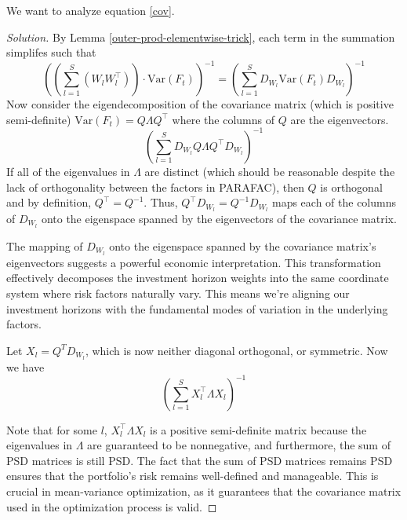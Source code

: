

\begin{note}
We want to analyze equation \ref{cov}.

\begin{proof}[Solution]
By Lemma \ref{outer-prod-elementwise-trick}, each term in the summation simplifes such that
\[\left( \left( \sum_{l=1}^S (W_l W_l^\top)\right) \cdot \text{Var}(F_t)\right)^{-1}  = \left( \sum_{l=1}^S D_{W_l} \text{Var}(F_t) D_{W_l}\right)^{-1}\]
Now consider the eigendecomposition of the covariance matrix (which is positive semi-definite) $\text{Var}(F_t) = Q\Lambda Q^\top$
where the columns of $Q$ are the eigenvectors. 
\[\left( \sum_{l=1}^S D_{W_l} Q \Lambda Q^\top D_{W_l}\right)^{-1}\]
If all of the eigenvalues in $\Lambda$ are distinct (which should be reasonable despite the 
lack of orthogonality between the factors in PARAFAC), then $Q$ is orthogonal and by definition, 
$Q^\top = Q^{-1}$. Thus, $Q^\top D_{W_l} = Q^{-1} D_{W_l}$ maps each of the columns of $D_{W_l}$
onto the eigenspace spanned by the eigenvectors of the covariance matrix. 

The mapping of $D_{W_l}$ onto the eigenspace spanned by the covariance matrix’s eigenvectors suggests a powerful economic interpretation. 
This transformation effectively decomposes the investment horizon weights into the same coordinate system where risk factors naturally vary. 
This means we’re aligning our investment horizons with the fundamental modes of variation in the underlying factors.

Let $X_l = Q^T D_{W_l}$, which is now neither diagonal orthogonal, or symmetric. Now we have 
\[\left( \sum_{l=1}^S X_l^\top \Lambda X_l \right)^{-1}\]

Note that for some $l$, $X_l^\top \Lambda X_l$ is a positive semi-definite matrix because the eigenvalues 
in $\Lambda$ are guaranteed to be nonnegative, and furthermore, the sum of PSD matrices is still PSD. The fact that the sum of PSD matrices remains PSD ensures that the portfolio's risk remains 
well-defined and manageable. This is crucial in mean-variance optimization, as it guarantees that the covariance matrix used in the optimization process is valid.
\end{proof}
\end{note}



